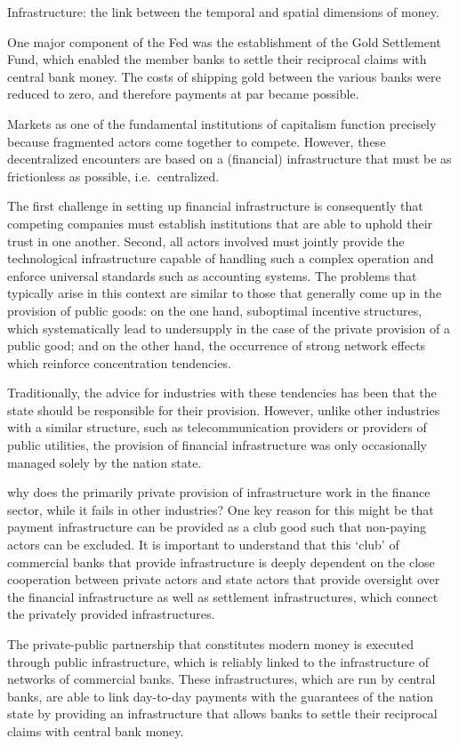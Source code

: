 \documentclass[
]{book}
\begin{document}
Infrastructure: the link between the temporal and spatial dimensions of money.

One major component of the Fed was the establishment of the Gold Settlement Fund, which enabled the member banks to settle their reciprocal claims with central bank money. The costs of shipping gold between the various banks were reduced to zero, and therefore payments at par became possible.

Markets as one of the fundamental institutions of capitalism function precisely because fragmented actors come together to compete. However, these decentralized encounters are based on a (financial) infrastructure that must be as frictionless as possible, i.e.~centralized.

The first challenge in setting up financial infrastructure is consequently that competing companies must establish institutions that are able to uphold their trust in one another. Second, all actors involved must jointly provide the technological infrastructure capable of handling such a complex operation and enforce universal standards such as accounting systems. The problems that typically arise in this context are similar to those that generally come up in the provision of public goods: on the one hand, suboptimal incentive structures, which systematically lead to undersupply in the case of the private provision of a public good; and on the other hand, the occurrence of strong network effects which reinforce concentration tendencies.

Traditionally, the advice for industries with these tendencies has been that the state should be responsible for their provision. However, unlike other industries with a similar structure, such as telecommunication providers or providers of public utilities, the provision of financial infrastructure was only occasionally managed solely by the nation state.

why does the primarily private provision of infrastructure work in the finance sector, while it fails in other industries? One key reason for this might be that payment infrastructure can be provided as a club good such that non-paying actors can be excluded. It is important to understand that this `club' of commercial banks that provide infrastructure is deeply dependent on the close cooperation between private actors and state actors that provide oversight over the financial infrastructure as well as settlement infrastructures, which connect the privately provided infrastructures.

The private-public partnership that constitutes modern money is executed through public infrastructure, which is reliably linked to the infrastructure of networks of commercial banks. These infrastructures, which are run by central banks, are able to link day-to-day payments with the guarantees of the nation state by providing an infrastructure that allows banks to settle their reciprocal claims with central bank money.
\end{document}
